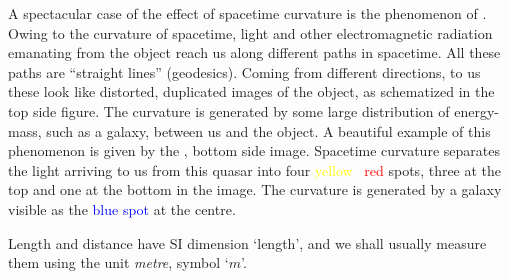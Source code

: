 A spectacular case of the effect of spacetime curvature is the phenomenon of . Owing to the curvature of spacetime, light and other electromagnetic radiation emanating from the object reach us along different paths in spacetime. All these paths are \enquote{straight lines} (geodesics). Coming from different directions, to us these look like distorted, duplicated images of the object, as schematized in the top side figure. The curvature is generated by some large distribution of energy-mass, such as a galaxy, between us and the object. A beautiful example of this phenomenon is given by the , bottom side image. Spacetime curvature separates the light arriving to us from this quasar into four \textcolor{yellow}{yellow} \amp\ \textcolor{red}{red} spots, three at the top and one at the bottom in the image. The curvature is generated by a galaxy visible as the \textcolor{blue}{blue spot} at the centre.%

\medskip

Length and distance have SI dimension \enquote*{\textsf{length}}, and we shall usually measure them using the unit \emph{metre}, symbol \enquote*{$\unit{m}$}.

